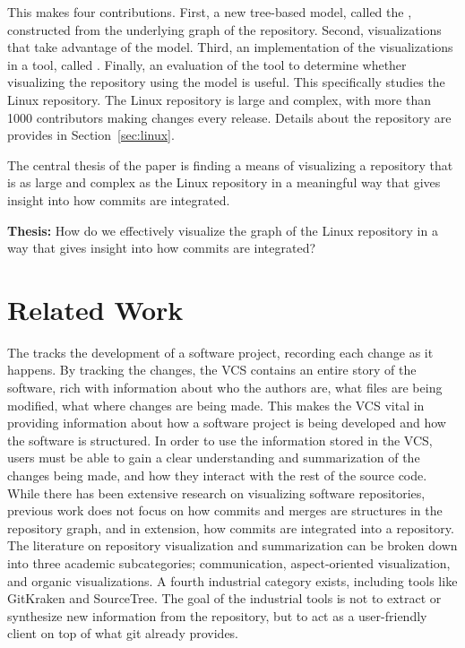 This \paper{} makes four contributions. First, a new tree-based model,
called the \mt{}, constructed from the underlying graph of the
repository.  Second, visualizations that take advantage of the \mt{}
model. Third, an implementation of the visualizations in a tool, called
\tool{}. Finally, an evaluation of the tool to determine whether
visualizing the repository using the model is useful. This \paper{}
specifically studies the Linux repository. The Linux repository is large
and complex, with more than 1000 contributors making changes every
release. Details about the repository are provides in
Section~\ref{sec:linux}.

The central thesis of the paper is finding a means of visualizing a
repository that is as large and complex as the Linux repository in a
meaningful way that gives insight into how commits are integrated.

\begin{textbox}
  \textbf{Thesis:} How do we effectively visualize the graph of the
  Linux repository in a way that gives insight into how commits are
  integrated?
\end{textbox}

\section{Related Work}\label{sec:related_work}

The  tracks the development of a
software project, recording each change as it happens. By tracking the
changes, the VCS contains an entire story of the software, rich with
information about who the authors are, what files are being modified,
what where changes are being made. This makes the VCS vital in providing
information about how a software project is being developed and how the
software is structured. In order to use the information stored in the
VCS, users must be able to gain a clear understanding and summarization
of the changes being made, and how they interact with the rest of the
source code. While there has been extensive research on visualizing
software repositories, previous work does not focus on how commits and
merges are structures in the repository graph, and in extension, how
commits are integrated into a repository. The literature on repository
visualization and summarization can be broken down into three academic
subcategories; communication\cite{Cubranic2005,Begel2010},
aspect-oriented visualization\cite{Ambros2005,Burch2005,Ambros2009}, and
organic visualizations\cite{ogawa09,Caudwell2010}. A fourth industrial
category exists, including tools like GitKraken and SourceTree. The goal
of the industrial tools is not to extract or synthesize new information
from the repository, but to act as a user-friendly client on top of what
git already provides.


